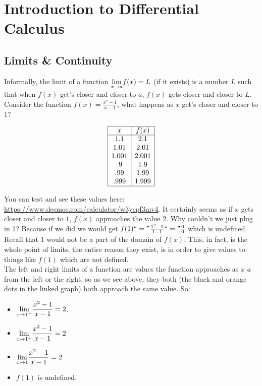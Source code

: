 
\chapter{Introduction to Differential Calculus}\label{Chapter:Calculus}


\section{Limits \& Continuity}\label{Section:LimitsContinuity}

Informally, the limit of a function $\displaystyle{ \lim_{x \to a}} f(x)=L$ (if it exists) is a number $L$ such that when $f(x)$ get's closer and closer to $a$, $f(x)$ gets closer and closer to $L$. \\

Consider the function $f(x)=\frac{x^2-1}{x-1}$, what happens as $x$ get's closer and closer to 1?

$$
\begin{array}{|c|c|}
\hline
x & f(x)\\
\hline
1.1 & 2.1\\
1.01 & 2.01\\
1.001 & 2.001\\
.9 & 1.9\\
.99&1.99\\
.999 & 1.999\\
\hline
\end{array}$$

You can test and see these values here: \url{https://www.desmos.com/calculator/w3ycpf3mv4}.  It certainly seems as if $x$ gets closer and closer to $1$, $f(x)$ approaches the value $2$.  Why couldn't we just plug in 1?  Because if we did we would get $f(1)``="\frac{1^2-1}{1-1}``="\frac{0}{0}$ which is undefined.  Recall that $1$ would not be a part of the domain of $f(x)$.  This, in fact, is the whole point of limits, the entire reason they exist, is in order to give values to things like $f(1)$ which are not defined.\\

The left and right limits of a function are values the function approaches as $x$ $a$ from the left or the right, so as we see above, they both (the black and orange dots in the linked graph) both approach the same value.  So:

\begin{itemize}
\item $\displaystyle{ \lim_{x \to 1^-}}\frac{x^2-1}{x-1}=2$.
\item $\displaystyle{ \lim_{x \to 1^+}}\frac{x^2-1}{x-1}=2$
\item $\displaystyle{ \lim_{x \to 1}}\frac{x^2-1}{x-1}=2$
\item $f(1)$ is undefined.
\end{itemize}


